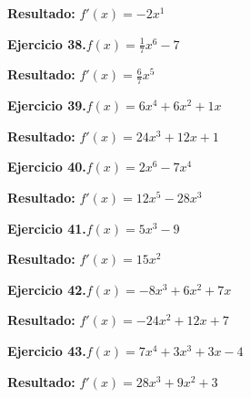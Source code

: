 \documentclass[10pt,a4paper]{article}
\begin{document}
\begin{solbox}
\textbf{Resultado:} \(\displaystyle f'(x) = -2x^{1}\)
\end{solbox}

\begin{ejbox}
\textbf{Ejercicio 38.}\quad $f(x) = \frac{1}{7}x^{6} -7$
\end{ejbox}

\begin{solbox}
\textbf{Resultado:} \(\displaystyle f'(x) = \frac{6}{7}x^{5}\)
\end{solbox}

\begin{ejbox}
\textbf{Ejercicio 39.}\quad $f(x) = 6x^{4} +6x^2 +1x$
\end{ejbox}

\begin{solbox}
\textbf{Resultado:} \(\displaystyle f'(x) = 24x^{3} +12x +1\)
\end{solbox}

\newpage
\begin{ejbox}
\textbf{Ejercicio 40.}\quad $f(x) = 2x^{6} -7x^{4}$
\end{ejbox}

\begin{solbox}
\textbf{Resultado:} \(\displaystyle f'(x) = 12x^{5} -28x^{3}\)
\end{solbox}

\begin{ejbox}
\textbf{Ejercicio 41.}\quad $f(x) = 5x^{3} -9$
\end{ejbox}

\begin{solbox}
\textbf{Resultado:} \(\displaystyle f'(x) = 15x^{2}\)
\end{solbox}

\begin{ejbox}
\textbf{Ejercicio 42.}\quad $f(x) = -8x^3 +6x^2 +7x$
\end{ejbox}

\begin{solbox}
\textbf{Resultado:} \(\displaystyle f'(x) = -24x^2 +12x +7\)
\end{solbox}

\newpage
\begin{ejbox}
\textbf{Ejercicio 43.}\quad $f(x) = 7x^{4} +3x^{3} +3x -4$
\end{ejbox}

\begin{solbox}
\textbf{Resultado:} \(\displaystyle f'(x) = 28x^{3} +9x^{2} +3\)
\end{solbox}
\end{document}
